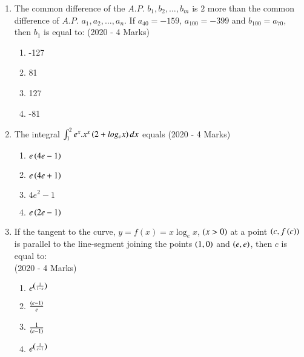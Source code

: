 \documentclass[journal]{IEEEtran}
\begin{document}
\begin{enumerate}
{        }
    \item{
     
            The common difference of the $A.P.$ $b_1, b_2, \ldots, b_m$ is $2$ more than the common difference of $A.P.$ $a_1, a_2, \ldots, a_n$. If $a_{40} = -159$, $a_{100} = -399$ and $b_{100} = a_{70}$, then $b_1$ is equal to:\hfill
                {(2020 - 4 Marks)}
            \begin{multicols}{4}
                \begin{enumerate}
                    \item -127
                    \item 81
                    \item 127
                    \item -81
                \end{enumerate}
            \end{multicols}
        
        }
    \item{
            The integral $\int_{1}^{2}e^{x}.x^{x}\left(2+log_{e}x\right)dx$ equals
           	\hfill
                {(2020 - 4 Marks)}
            
            \begin{multicols}{2}
				\begin{enumerate}
					\item $e\left(4e-1\right)$
					\item $e\left(4e+1\right)$
					\item $4e^2-1$
					\item $e\left(2e-1\right)$
				\end{enumerate}
			\end{multicols}
        
        }
 	\item{
        	If the tangent to the curve, $y = f(x) = x\log_e x$, $\left(x>0\right)$ at a point $\left(c,f\left(c\right)\right)$ is parallel to the line-segment joining the points $\left(1,0\right)$ and $\left(e,e\right)$, then $c$ is equal to: \\ \text{ }
        	\hfill
        	{(2020 - 4 Marks)}
        	
        	\begin{multicols}{4}
        		\begin{enumerate}
					\item \( e^{\left(\frac{1}{1-e}\right)} \)
					\item \( \frac{\left(e-1\right)}{e} \)
					\item \( \frac{1}{\left(e-1\right)} \)
					\item \( e^{\left(\frac{1}{e-1}\right)} \)
        		\end{enumerate}
        	\end{multicols}
        	
}
\end{enumerate}
\end{document}
